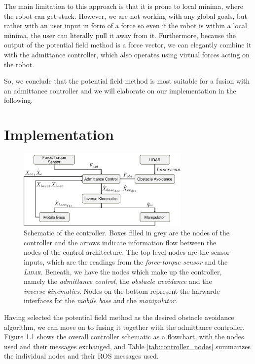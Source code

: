 The main limitation to this approach is that it is prone to local minima, where the robot can get stuck. However, we are not working with any global goals, but rather with an user input in form of a force so even if the robot is within a local minima, the user can literally pull it away from it. Furthermore, because the output of the potential field method is a force vector, we can elegantly combine it with the admittance controller, which also operates using virtual forces acting on the robot. 

So, we conclude that the potential field method is most suitable for a fusion with an admittance controller and we will elaborate on our implementation in the following.

\chapter{Implementation}
\label{sec:implementation}
\begin{figure}
   \centering
   \includegraphics[width=0.75\textwidth]{images/controller_overview.pdf}
   \caption{Schematic of the controller. Boxes filled in grey are the nodes of the controller and the arrows indicate information flow between the nodes of the control architecture. The top level nodes are the sensor inputs, which are the readings from the \emph{force-torque sensor} and the \emph{\textsc{Lidar}}. Beneath, we have the nodes which make up the controller, namely the \emph{admittance control}, the \emph{obstacle avoidance} and the \emph{inverse kinematics}. Nodes on the bottom represent the harwarde interfaces for the \emph{mobile base} and the \emph{manipulator}.}
   \label{pics:controller_overview}
\end{figure}

Having selected the potential field method as the desired obstacle avoidance algorithm, we can move on to fusing it together with the admittance controller. Figure \ref{pics:controller_overview} shows the overall controller schematic as a flowchart, with the nodes used and their messages exchanged, and Table \ref{tab:controller_nodes} summarizes the individual nodes and their ROS messages used.

